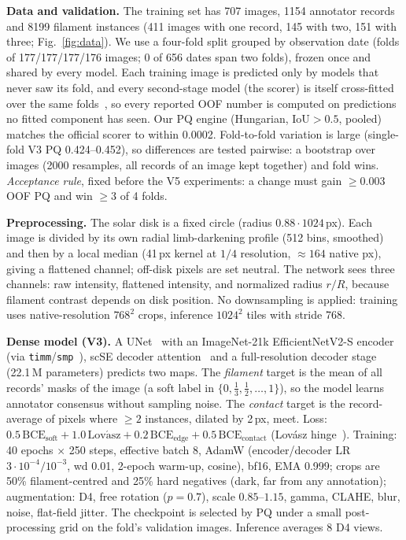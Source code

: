 \documentclass[sigconf]{acmart}
\begin{document}
\textbf{Data and validation.} The training set has 707 images, 1154 annotator records and 8199 filament instances (411 images with one record, 145 with two, 151 with three; Fig.~\ref{fig:data}). We use a four-fold split grouped by observation date (folds of 177/177/177/176 images; 0 of 656 dates span two folds), frozen once and shared by every model. Each training image is predicted only by models that never saw its fold, and every second-stage model (the scorer) is itself cross-fitted over the same folds~\cite{chernozhukov2018dml}, so every reported OOF number is computed on predictions no fitted component has seen. Our PQ engine (Hungarian, IoU${>}0.5$, pooled) matches the official scorer to within 0.0002. Fold-to-fold variation is large (single-fold V3 PQ 0.424--0.452), so differences are tested pairwise: a bootstrap over images (2000 resamples, all records of an image kept together) and fold wins. \emph{Acceptance rule}, fixed before the V5 experiments: a change must gain ${\ge}0.003$ OOF PQ and win ${\ge}3$ of 4 folds.

\textbf{Preprocessing.} The solar disk is a fixed circle (radius $0.88\cdot1024$\,px). Each image is divided by its own radial limb-darkening profile (512 bins, smoothed) and then by a local median (41\,px kernel at $1/4$ resolution, ${\approx}164$ native px), giving a flattened channel; off-disk pixels are set neutral. The network sees three channels: raw intensity, flattened intensity, and normalized radius $r/R$, because filament contrast depends on disk position. No downsampling is applied: training uses native-resolution $768^2$ crops, inference $1024^2$ tiles with stride 768.

\textbf{Dense model (V3).} A UNet~\cite{ronneberger2015unet} with an ImageNet-21k EfficientNetV2-S encoder~\cite{tan2021efficientnetv2} (via \texttt{timm}/\texttt{smp}~\cite{wightman2019timm,iakubovskii2019smp}), scSE decoder attention~\cite{roy2018scse} and a full-resolution decoder stage (22.1\,M parameters) predicts two maps. The \emph{filament} target is the mean of all records' masks of the image (a soft label in $\{0,\tfrac13,\tfrac12,\dots,1\}$), so the model learns annotator consensus without sampling noise. The \emph{contact} target is the record-average of pixels where ${\ge}2$ instances, dilated by 2\,px, meet. Loss: $0.5\,\mathrm{BCE}_{\mathrm{soft}}+1.0\,\mathrm{Lov\acute{a}sz}+0.2\,\mathrm{BCE}_{\mathrm{edge}}+0.5\,\mathrm{BCE}_{\mathrm{contact}}$ (Lov\'asz hinge~\cite{berman2018lovasz}). Training: 40 epochs $\times$ 250 steps, effective batch 8, AdamW (encoder/decoder LR $3{\cdot}10^{-4}/10^{-3}$, wd 0.01, 2-epoch warm-up, cosine), bf16, EMA 0.999; crops are 50\% filament-centred and 25\% hard negatives (dark, far from any annotation); augmentation: D4, free rotation ($p{=}0.7$), scale $0.85$--$1.15$, gamma, CLAHE, blur, noise, flat-field jitter. The checkpoint is selected by PQ under a small post-processing grid on the fold's validation images. Inference averages 8 D4 views.
\end{document}
